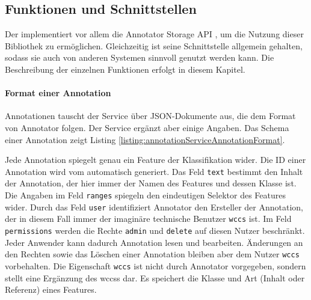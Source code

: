 \subsection{Funktionen und Schnittstellen}
    \label{section:solutionDetailsAnnotationServiceFunctions}
    Der {\annotationService} implementiert vor allem die
    Annotator Storage API \cite[Kapitel "`Storage"']{annotator:documentation},
    um die Nutzung dieser Bibliothek zu ermöglichen.
    Gleichzeitig ist seine Schnittstelle allgemein gehalten,
    sodass sie auch von anderen Systemen sinnvoll genutzt werden kann.
    Die Beschreibung der einzelnen Funktionen erfolgt in diesem Kapitel.

    \paragraph{Format einer Annotation}
    Annotationen tauscht der Service über JSON-Dokumente aus,
    die dem Format von Annotator \cite[Kapitel "`Annotation format"']{annotator:documentation} folgen.
    Der Service ergänzt aber einige Angaben.
    Das Schema einer Annotation zeigt Listing \ref{listing:annotationServiceAnnotationFormat}.

    

    Jede Annotation spiegelt genau ein Feature der Klassifikation wider.
    Die ID einer Annotation wird vom {\annotationService} automatisch
    generiert.
    Das Feld \texttt{text} bestimmt den Inhalt der Annotation,
    der hier immer der Namen des Features und dessen Klasse ist.
    Die Angaben im Feld \texttt{ranges} spiegeln den eindeutigen Selektor des Features wider.
    Durch das Feld \texttt{user} identifiziert Annotator den Ersteller der Annotation,
    der in diesem Fall immer der imaginäre technische Benutzer \texttt{wccs} ist.
    Im Feld \texttt{permissions} werden die Rechte \texttt{admin} und \texttt{delete} auf diesen Nutzer beschränkt.
    Jeder Anwender kann dadurch Annotation lesen und bearbeiten.
    Änderungen an den Rechten sowie das Löschen einer Annotation bleiben aber dem Nutzer \texttt{wccs} vorbehalten.
    Die Eigenschaft \texttt{wccs} ist nicht durch Annotator vorgegeben,
    sondern stellt eine Ergänzung des \glspl{wccs} dar.
    Es speichert die Klasse und Art (Inhalt oder Referenz) eines Features.

